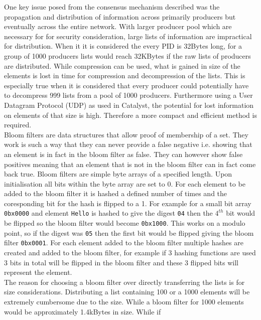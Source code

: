 \documentclass{article}
\begin{document}
One key issue posed from the consensus mechanism described was the propagation and distribution of information across primarily producers but eventually across the entire network. With larger producer pool which are necessary for for security consideration, large lists of information are impractical for distribution. When it it is considered the every PID is 32Bytes long, for a group of 1000 producers lists would reach 32KBytes if the raw lists of producers are distributed. While compression can be used, what is gained in size of the elements is lost in time for compression and decompression of the lists. This is especially true when it is considered that every producer could potentially have to decompress 999 lists from a pool of 1000 producers. Furthermore using a User Datagram Protocol (UDP) as used in Catalyst, the potential for lost information on elements of that size is high. Therefore a more compact and efficient method is required. \\

Bloom filters are data structures that allow proof of membership of a set. They work is such a way that they can never provide a false negative i.e. showing that an element is in fact in the bloom filter as false. They can however show false positives meaning that an element that is not in the bloom filter can in fact come back true. Bloom filters are simple byte arrays of a specified length. Upon initialisation all bits within the byte array are set to 0. For each element to be added to the bloom filter it is hashed a defined number of times and the coresponding bit for the hash is flipped to a 1. For example for a small bit array \verb'0bx0000' and element \verb'Hello' is hashed to give the digest \verb'04' then the $4^{th}$ bit would be flipped so the bloom filter would become \verb'0bx1000'. This works on a modulo point, so if the digest was \verb'05' then the first bit would be flipped giving the bloom filter \verb'0bx0001'. For each element added to the bloom filter multiple hashes are created and added to the bloom filter, for example if 3 hashing functions are used 3 bits in total will be flipped in the bloom filter and these 3 flipped bits will represent the element. \\

The reason for choosing a bloom filter over directly transferring the lists is for size considerations. Distributing a list containing 100 or a 1000 elements will be extremely cumbersome due to the size. While a bloom filter for 1000 elements would be approximately 1.4kBytes in size. While if 
\end{document}
